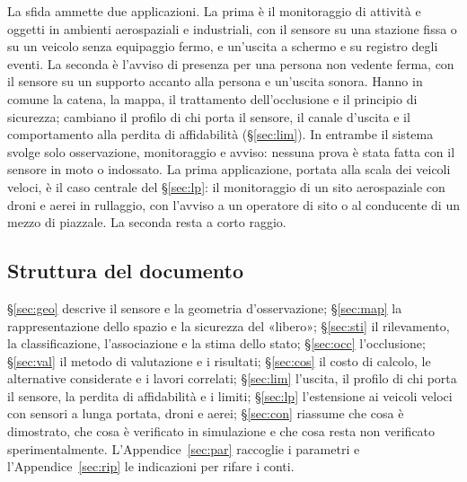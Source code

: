 La sfida ammette due applicazioni. La prima è il monitoraggio di attività e oggetti in ambienti aerospaziali e industriali, con il sensore su una stazione fissa o su un veicolo senza equipaggio fermo, e un'uscita a schermo e su registro degli eventi. La seconda è l'avviso di presenza per una persona non vedente ferma, con il sensore su un supporto accanto alla persona e un'uscita sonora. Hanno in comune la catena, la mappa, il trattamento dell'occlusione e il principio di sicurezza; cambiano il profilo di chi porta il sensore, il canale d'uscita e il comportamento alla perdita di affidabilità (\S\ref{sec:lim}). In entrambe il sistema svolge solo osservazione, monitoraggio e avviso: nessuna prova è stata fatta con il sensore in moto o indossato. La prima applicazione, portata alla scala dei veicoli veloci, è il caso centrale del \S\ref{sec:lp}: il monitoraggio di un sito aerospaziale con droni e aerei in rullaggio, con l'avviso a un operatore di sito o al conducente di un mezzo di piazzale. La seconda resta a corto raggio.

\subsection{Struttura del documento}\label{sec:intro-struttura}

\S\ref{sec:geo} descrive il sensore e la geometria d'osservazione; \S\ref{sec:map} la rappresentazione dello spazio e la sicurezza del «libero»; \S\ref{sec:sti} il rilevamento, la classificazione, l'associazione e la stima dello stato; \S\ref{sec:occ} l'occlusione; \S\ref{sec:val} il metodo di valutazione e i risultati; \S\ref{sec:cos} il costo di calcolo, le alternative considerate e i lavori correlati; \S\ref{sec:lim} l'uscita, il profilo di chi porta il sensore, la perdita di affidabilità e i limiti; \S\ref{sec:lp} l'estensione ai veicoli veloci con sensori a lunga portata, droni e aerei; \S\ref{sec:con} riassume che cosa è dimostrato, che cosa è verificato in simulazione e che cosa resta non verificato sperimentalmente. L'Appendice~\ref{sec:par} raccoglie i parametri e l'Appendice~\ref{sec:rip} le indicazioni per rifare i conti.
